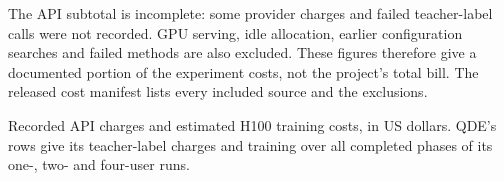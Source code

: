 The API subtotal is incomplete: some provider charges and failed teacher-label calls were not recorded. GPU serving, idle allocation, earlier configuration searches and failed methods are also excluded. These figures therefore give a documented portion of the experiment costs, not the project's total bill. The released cost manifest lists every included source and the exclusions.

\begin{table}[htbp]
\centering
\footnotesize
\setlength{\tabcolsep}{4pt}
\begin{adjustbox}{max width=\linewidth}

\end{adjustbox}
\caption{Recorded API charges and estimated H100 training costs, in US dollars. QDE's rows give its teacher-label charges and training over all completed phases of its one-, two- and four-user runs.}
\label{tab:experiment-costs}
\end{table}
